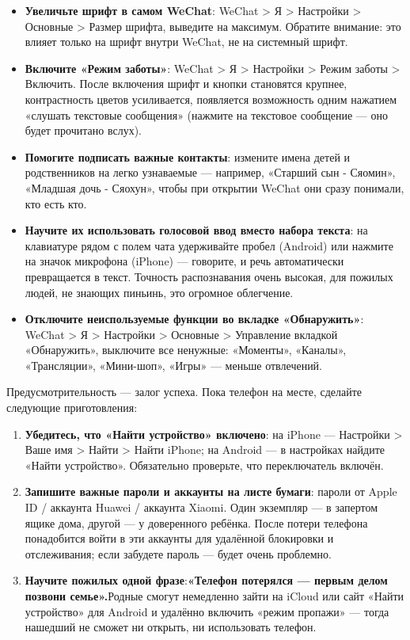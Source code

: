\begin{itemize}
  \item \textbf{Увеличьте шрифт в самом WeChat}: WeChat > Я > Настройки > Основные > Размер шрифта, выведите на максимум. Обратите внимание: это влияет только на шрифт внутри WeChat, не на системный шрифт.
  \item \textbf{Включите «Режим заботы»}: WeChat > Я > Настройки > Режим заботы > Включить. После включения шрифт и кнопки становятся крупнее, контрастность цветов усиливается, появляется возможность одним нажатием «слушать текстовые сообщения» (нажмите на текстовое сообщение — оно будет прочитано вслух).
  \item \textbf{Помогите подписать важные контакты}: измените имена детей и родственников на легко узнаваемые — например, «Старший сын - Сяомин», «Младшая дочь - Сяохун», чтобы при открытии WeChat они сразу понимали, кто есть кто.
  \item \textbf{Научите их использовать голосовой ввод вместо набора текста}: на клавиатуре рядом с полем чата удерживайте пробел (Android) или нажмите на значок микрофона (iPhone) — говорите, и речь автоматически превращается в текст. Точность распознавания очень высокая, для пожилых людей, не знающих пиньинь, это огромное облегчение.
  \item \textbf{Отключите неиспользуемые функции во вкладке «Обнаружить»}: WeChat > Я > Настройки > Основные > Управление вкладкой «Обнаружить», выключите все ненужные: «Моменты», «Каналы», «Трансляции», «Мини-шоп», «Игры» — меньше отвлечений.
\end{itemize}


Предусмотрительность — залог успеха. Пока телефон на месте, сделайте следующие приготовления:

\begin{enumerate}
  \item \textbf{Убедитесь, что «Найти устройство» включено}: на iPhone — Настройки > Ваше имя > Найти > Найти iPhone; на Android — в настройках найдите «Найти устройство». Обязательно проверьте, что переключатель включён.
  \item \textbf{Запишите важные пароли и аккаунты на листе бумаги}: пароли от Apple ID / аккаунта Huawei / аккаунта Xiaomi. Один экземпляр — в запертом ящике дома, другой — у доверенного ребёнка. После потери телефона понадобится войти в эти аккаунты для удалённой блокировки и отслеживания; если забудете пароль — будет очень проблемно.
  \item \textbf{Научите пожилых одной фразе}:\textbf{«Телефон потерялся — первым делом позвони семье».}Родные смогут немедленно зайти на iCloud или сайт «Найти устройство» для Android и удалённо включить «режим пропажи» — тогда нашедший не сможет ни открыть, ни использовать телефон.
\end{enumerate}

